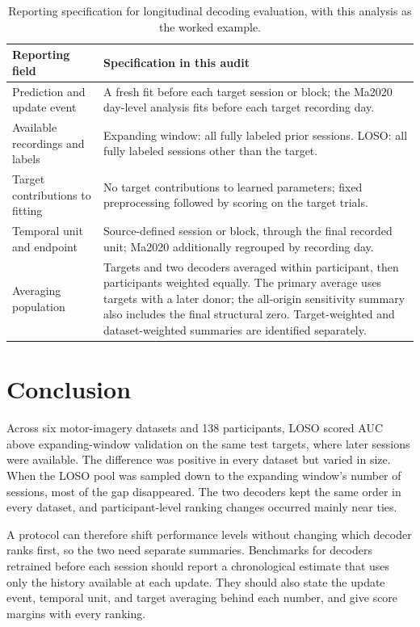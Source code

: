 \documentclass{ieeeaccess}
\newcommand{\settableformat}{%
  \fontsize{8}{10}\selectfont
  \setlength{\tabcolsep}{4pt}%
  \renewcommand{\arraystretch}{1.12}%
  \setlength{\heavyrulewidth}{0.7pt}%
  \setlength{\lightrulewidth}{0.4pt}%
}
\begin{document}
\begin{table}[!t]
\centering
\settableformat
\caption{Reporting specification for longitudinal decoding evaluation, with this
analysis as the worked example.}
\label{tab:reporting}
\begin{tabularx}{\textwidth}{@{}>{\raggedright\arraybackslash}p{}>{\raggedright\arraybackslash}X@{}}
\toprule
\textbf{Reporting field} & \textbf{Specification in this audit}\\
\midrule
Prediction and update event & A fresh fit before each target session or block;
the Ma2020 day-level analysis fits before each target recording day.\\
\addlinespace[2pt]
Available recordings and labels & Expanding window: all fully labeled prior sessions.
LOSO: all fully labeled sessions other than the target.\\
\addlinespace[2pt]
Target contributions to fitting & No target contributions to learned parameters;
fixed preprocessing followed by scoring on the target trials.\\
\addlinespace[2pt]
Temporal unit and endpoint & Source-defined session or block, through the final
recorded unit; Ma2020 additionally regrouped by recording day.\\
\addlinespace[2pt]
Averaging population & Targets and two decoders averaged within participant, then
participants weighted equally. The primary average uses targets with a later
donor; the all-origin sensitivity summary also includes the final structural
zero. Target-weighted and dataset-weighted summaries are identified separately.\\
\bottomrule
\end{tabularx}
\end{table}

\section{Conclusion}
Across six motor-imagery datasets and 138 participants, LOSO scored
\CondGapMeanUnsigned{} AUC above expanding-window validation on the same test targets,
where later sessions were available. The difference was positive in every
dataset but varied in size. When the LOSO pool was sampled down to the
expanding window's number of sessions, most of the gap disappeared. The two
decoders kept the same order in every dataset, and participant-level ranking
changes occurred mainly near ties.

A protocol can therefore shift performance levels without changing which
decoder ranks first, so the two need separate summaries. Benchmarks for
decoders retrained before each session should report a chronological estimate
that uses only the history available at each update. They should also state the
update event, temporal unit, and target averaging behind each number, and give
score margins with every ranking.
\end{document}
